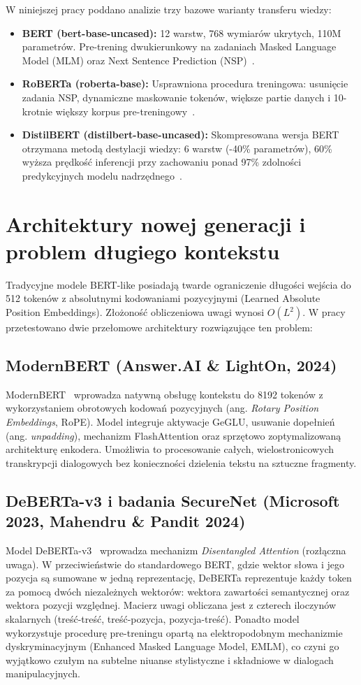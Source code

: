 \documentclass[12pt,a4paper,twoside]{report}
\begin{document}
W niniejszej pracy poddano analizie trzy bazowe warianty transferu wiedzy:
\begin{itemize}[leftmargin=*]
  \item \textbf{BERT (bert-base-uncased):} 12 warstw, 768 wymiarów ukrytych, 110M parametrów. Pre-trening dwukierunkowy na zadaniach Masked Language Model (MLM) oraz Next Sentence Prediction (NSP)~\cite{devlin2019}.
  \item \textbf{RoBERTa (roberta-base):} Usprawniona procedura treningowa: usunięcie zadania NSP, dynamiczne maskowanie tokenów, większe partie danych i 10-krotnie większy korpus pre-treningowy~\cite{liu2019}.
  \item \textbf{DistilBERT (distilbert-base-uncased):} Skompresowana wersja BERT otrzymana metodą destylacji wiedzy: 6 warstw (-40\% parametrów), 60\% wyższa prędkość inferencji przy zachowaniu ponad 97\% zdolności predykcyjnych modelu nadrzędnego~\cite{sanh2019}.
\end{itemize}

\section{Architektury nowej generacji i problem długiego kontekstu}
Tradycyjne modele BERT-like posiadają twarde ograniczenie długości wejścia do 512 tokenów z absolutnymi kodowaniami pozycyjnymi (Learned Absolute Position Embeddings). Złożoność obliczeniowa uwagi wynosi $O(L^2)$. W pracy przetestowano dwie przełomowe architektury rozwiązujące ten problem:

\subsection{ModernBERT (Answer.AI \& LightOn, 2024)}
ModernBERT~\cite{modernbert2024} wprowadza natywną obsługę kontekstu do 8192 tokenów z wykorzystaniem obrotowych kodowań pozycyjnych (ang. \emph{Rotary Position Embeddings}, RoPE). Model integruje aktywacje GeGLU, usuwanie dopełnień (ang. \emph{unpadding}), mechanizm FlashAttention oraz sprzętowo zoptymalizowaną architekturę enkodera. Umożliwia to procesowanie całych, wielostronicowych transkrypcji dialogowych bez konieczności dzielenia tekstu na sztuczne fragmenty.

\subsection{DeBERTa-v3 i badania SecureNet (Microsoft 2023, Mahendru \& Pandit 2024)}
Model DeBERTa-v3~\cite{deberta2023} wprowadza mechanizm \emph{Disentangled Attention} (rozłączna uwaga). W przeciwieństwie do standardowego BERT, gdzie wektor słowa i jego pozycja są sumowane w jedną reprezentację, DeBERTa reprezentuje każdy token za pomocą dwóch niezależnych wektorów: wektora zawartości semantycznej oraz wektora pozycji względnej. Macierz uwagi obliczana jest z czterech iloczynów skalarnych (treść-treść, treść-pozycja, pozycja-treść). Ponadto model wykorzystuje procedurę pre-treningu opartą na elektropodobnym mechanizmie dyskryminacyjnym (Enhanced Masked Language Model, EMLM), co czyni go wyjątkowo czułym na subtelne niuanse stylistyczne i składniowe w dialogach manipulacyjnych.
\end{document}
